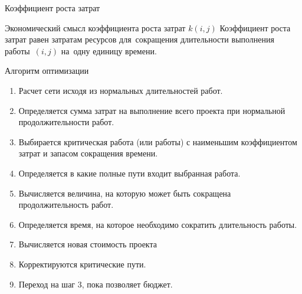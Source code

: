 \documentclass[unicode,11pt,notheorems]{beamer}
\begin{document}
\begin{frame}{Коэффициент роста затрат}
	\bigskip

\begin{block}{Экономический смысл 	коэффициента роста затрат $k(i,j)$}
		Коэффициент роста затрат равен затратам ресурсов для~сокращения длительности выполнения работы~$(i,j)$ на~одну единицу времени.		
\end{block}
\end{frame}
 

\begin{frame}{Алгоритм оптимизации}
	\begin{enumerate}
	\item 
		Расчет сети исходя из нормальных длительностей работ.
	\item 
		Определяется сумма затрат на выполнение всего проекта при нормальной продолжительности работ.
	\item 
		Выбирается критическая работа (или работы)  с наименьшим коэффициентом затрат и запасом сокращения времени.
	\item 
		Определяется в какие полные пути входит выбранная работа.
	\item 
		Вычисляется величина, на которую может быть сокращена продолжительность работ.
	\item 
		Определяется время, на которое необходимо сократить длительность работы.
	\item 
		Вычисляется новая стоимость проекта		
	\item 
		Корректируются критические пути.
	\item 
		Переход на шаг 3, пока позволяет бюджет.
\end{enumerate}
\end{frame}
\end{document}
